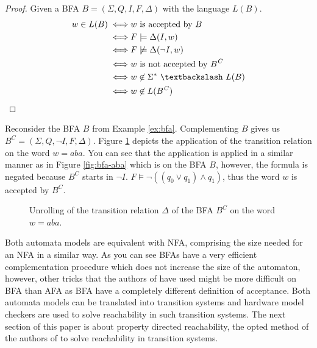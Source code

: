 \begin{proof}[Proof]
Given a BFA $B = (\Sigma, Q, I, F, \Delta)$ with the language $L(B)$.
\begin{align*}
w \in L(B) \iff & w \text{ is accepted by $B$}\\
\iff &F \models \Delta(I,w) \\
\iff &F \not \models \Delta(\lnot I, w) \\
\iff &w \text{ is not accepted by $B$}^{\mathit{C}} \\
\iff &w \not \in \Sigma^*~ \textbackslash~L(B) \\
\iff &w \not \in L(B^{\mathit{C}})
\end{align*}
\end{proof}

\begin{example}
Reconsider the BFA $B$ from Example \ref{ex:bfa}. Complementing $B$ gives us $B^{\mathit{C}} = (\Sigma, Q, \lnot I, F, \Delta)$. Figure \ref{fig:bfac-aba} depicts the application of the transition relation on the word $w = aba$.
You can see that the application is applied in a similar manner as in Figure \ref{fig:bfa-aba} which is on the BFA $B$, however, the formula is negated because $B^{\mathit{C}}$ starts in $\lnot I$.
$F \models \lnot ((q_0 \vee q_1) \wedge q_1)$, thus the word $w$ is accepted by $B^{\mathit{C}}$.
\end{example}


\begin{figure}
\centering
		\caption{Unrolling of the transition relation $\Delta$ of the BFA $B^{\mathit{C}}$ on the word $w = aba$.} \label{fig:bfac-aba}
\end{figure}

Both automata models are equivalent with NFA, comprising the size needed for an NFA in a similar way.
As you can see BFAs have a very efficient complementation procedure which does not increase the size of the automaton, however, other tricks that the authors of \sloth have used might be more difficult on BFA than AFA as BFA have a completely different definition of acceptance.
Both automata models can be translated into transition systems and hardware model checkers are used to solve reachability in such transition systems.
The next section of this paper is about property directed reachability, the opted method of the authors of \sloth to solve reachability in transition systems.